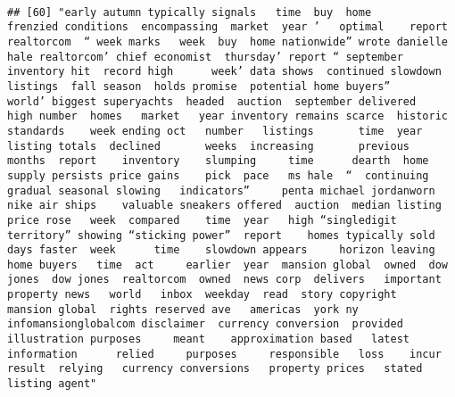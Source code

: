 \documentclass[
]{article}
\begin{document}
\begin{verbatim}
                                                                                                                                                                                                                                                                                                                                                                                                                                                                   
## [60] "early autumn typically signals   time  buy  home       frenzied conditions  encompassing  market  year ’   optimal    report  realtorcom  “ week marks   week  buy  home nationwide” wrote danielle hale realtorcom’ chief economist  thursday’ report “ september inventory hit  record high      week’ data shows  continued slowdown   listings  fall season  holds promise  potential home buyers”     world’ biggest superyachts  headed  auction  september delivered   high number  homes   market   year inventory remains scarce  historic standards    week ending oct   number   listings       time  year   listing totals  declined       weeks  increasing       previous  months  report    inventory    slumping     time      dearth  home supply persists price gains    pick  pace   ms hale  “  continuing    gradual seasonal slowing   indicators”     penta michael jordanworn nike air ships    valuable sneakers offered  auction  median listing price rose   week  compared    time  year   high “singledigit territory” showing “sticking power”  report    homes typically sold  days faster  week      time    slowdown appears     horizon leaving home buyers   time  act     earlier  year  mansion global  owned  dow jones  dow jones  realtorcom  owned  news corp  delivers   important property news   world   inbox  weekday  read  story copyright   mansion global  rights reserved ave   americas  york ny    infomansionglobalcom disclaimer  currency conversion  provided  illustration purposes     meant    approximation based   latest information      relied     purposes     responsible   loss    incur   result  relying   currency conversions   property prices   stated   listing agent"                                                                                                                                                                                                                                                                                                                                                                                                                                                                                                                                                                                                                                                                                                                                                                                                                                                                                                                                                                                                                                                                                                                                                                                                                         
\end{verbatim}
\end{document}

